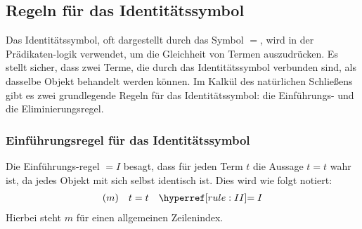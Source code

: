 \documentclass[main.tex]{subfiles}
\begin{document}
\subsection{Regeln für das Identitätssymbol}


Das Identitätssymbol, oft dargestellt durch das Symbol \(=\), wird in der Prädikaten-logik verwendet, um die Gleichheit von Termen auszudrücken. Es stellt sicher, dass zwei Terme, die durch das Identitätssymbol verbunden sind, als dasselbe Objekt behandelt werden können. Im Kalkül des natürlichen Schließens gibt es zwei grundlegende Regeln für das Identitätssymbol: die Einführungs- und die Eliminierungsregel.

\subsubsection{Einführungsregel für das Identitätssymbol}
\label{rule:II} 
\begin{definition}
Die Einführungs-regel \(=I\) besagt, dass für jeden Term \(t\) die Aussage \(t = t\) wahr ist, da jedes Objekt mit sich selbst identisch ist. Dies wird wie folgt notiert:
\[
\begin{array}{lll}
    (m) & t = t & \rII \\
\end{array}
\]
Hierbei steht \(m\) für einen allgemeinen Zeilenindex.
\end{definition}
\end{document}
